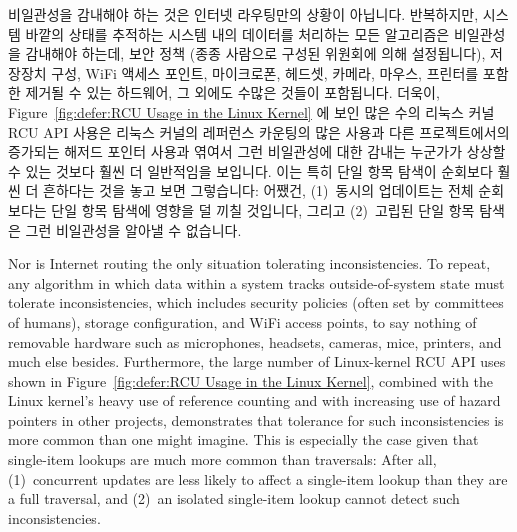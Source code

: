 비일관성을 감내해야 하는 것은 인터넷 라우팅만의 상황이 아닙니다.
반복하지만, 시스템 바깥의 상태를 추적하는 시스템 내의 데이터를 처리하는 모든
알고리즘은 비일관성을 감내해야 하는데, 보안 정책 (종종 사람으로 구성된 위원회에
의해 설정됩니다), 저장장치 구성, WiFi 액세스 포인트, 마이크로폰, 헤드셋,
카메라, 마우스, 프린터를 포함한 제거될 수 있는 하드웨어, 그 외에도 수많은
것들이 포함됩니다.
더욱이,
Figure~\ref{fig:defer:RCU Usage in the Linux Kernel} 에 보인 많은 수의 리눅스
커널 RCU API 사용은 리눅스 커널의 레퍼런스 카운팅의 많은 사용과 다른
프로젝트에서의 증가되는 해저드 포인터 사용과 엮여서 그런 비일관성에 대한 감내는
누군가가 상상할 수 있는 것보다 훨씬 더 일반적임을 보입니다.
이는 특히 단일 항목 탐색이 순회보다 훨씬 더 흔하다는 것을 놓고 보면 그렇습니다:
어쨌건, (1)~동시의 업데이트는 전체 순회보다는 단일 항목 탐색에 영향을 덜 끼칠
것입니다, 그리고 (2)~고립된 단일 항목 탐색은 그런 비일관성을 알아낼 수
없습니다.

\iffalse

Nor is Internet routing the only situation tolerating inconsistencies.
To repeat, any algorithm in which data within a system tracks
outside-of-system state must tolerate inconsistencies, which includes
security policies (often set by committees of humans), storage configuration,
and WiFi access points, to say nothing of removable hardware such as
microphones, headsets, cameras, mice, printers, and much else besides.
Furthermore, the large number of Linux-kernel RCU API uses shown in
Figure~\ref{fig:defer:RCU Usage in the Linux Kernel},
combined with the Linux kernel's heavy use of reference counting
and with increasing use of hazard pointers in other projects, demonstrates
that tolerance for such inconsistencies is more common than one might
imagine.
This is especially the case given that single-item lookups are much more
common than traversals:  After all, (1)~concurrent updates are less likely
to affect a single-item lookup than they are a full traversal, and
(2)~an isolated single-item lookup cannot detect such inconsistencies.

